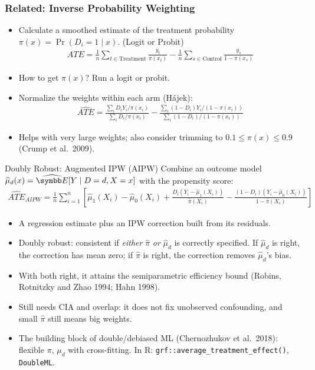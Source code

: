\documentclass[aspectratio=169,11pt]{beamer}
\begin{document}
\begin{frame}
\frametitle{Related: Inverse Probability Weighting}
\begin{itemize}
\item Calculate a smoothed estimate of the treatment probability $\pi(x) = \Pr(D_i =1 \mid x)$. (Logit or Probit)
\begin{align*}
ATE = \frac{1}{n}\sum_{t \in \text{Treatment}} \frac{y_t}{\pi(x_t)} - \frac{1}{n} \sum_{s \in \text{Control}} \frac{y_s}{1-\pi(x_s)}
\end{align*}
\item How to get $\pi(x)$? Run a logit or probit.
\item Normalize the weights within each arm (H\'ajek):
\begin{align*}
\widehat{ATE}=\frac{\sum_i D_iY_i/\pi(x_i)}{\sum_i D_i/\pi(x_i)}-\frac{\sum_i (1-D_i)Y_i/(1-\pi(x_i))}{\sum_i (1-D_i)/(1-\pi(x_i))}
\end{align*}
\item Helps with very large weights; also consider trimming to $0.1\le\pi(x)\le0.9$ (Crump et al.\ 2009).
\end{itemize}
\end{frame}


\begin{frame}{Doubly Robust: Augmented IPW (AIPW)}
\small
Combine an outcome model $\widehat\mu_d(x)=\widehat{\E}[Y\mid D=d,X=x]$ with the propensity score:
\begin{align*}
\widehat{ATE}_{AIPW}=\frac{1}{n}\sum_{i=1}^n\left[\widehat\mu_1(X_i)-\widehat\mu_0(X_i)
+\frac{D_i\left(Y_i-\widehat\mu_1(X_i)\right)}{\widehat\pi(X_i)}
-\frac{(1-D_i)\left(Y_i-\widehat\mu_0(X_i)\right)}{1-\widehat\pi(X_i)}\right]
\end{align*}
\begin{itemize}
\item A regression estimate plus an IPW correction built from its residuals.
\item \alert{Doubly robust}: consistent if \emph{either} $\widehat\pi$ \emph{or} $\widehat\mu_d$ is correctly specified. If $\widehat\mu_d$ is
right, the correction has mean zero; if $\widehat\pi$ is right, the correction removes $\widehat\mu_d$'s bias.
\item With both right, it attains the semiparametric efficiency bound (Robins, Rotnitzky and Zhao 1994; Hahn 1998).
\item Still needs CIA and overlap: it does not fix unobserved confounding, and small $\widehat\pi$ still means big weights.
\item The building block of double/debiased ML (Chernozhukov et al.\ 2018): flexible $\pi$, $\mu_d$ with cross-fitting. In R: \texttt{grf::average\_treatment\_effect()}, \texttt{DoubleML}.
\end{itemize}
\end{frame}
\end{document}
